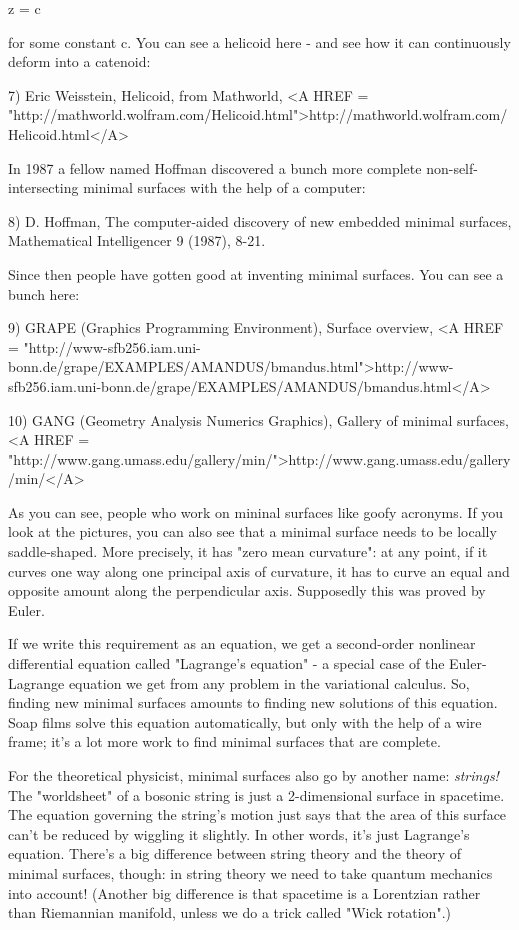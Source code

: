 z = c \theta 

for some constant c.   You can see a helicoid here - and see how it 
can continuously deform into a catenoid:

7) Eric Weisstein, Helicoid, from Mathworld,
<A HREF = "http://mathworld.wolfram.com/Helicoid.html">http://mathworld.wolfram.com/Helicoid.html</A>

In 1987 a fellow named Hoffman discovered a bunch more complete 
non-self-intersecting minimal surfaces with the help of a computer:

8) D. Hoffman, The computer-aided discovery of new embedded minimal 
surfaces, Mathematical Intelligencer 9 (1987), 8-21.

Since then people have gotten good at inventing minimal surfaces.  
You can see a bunch here:

9) GRAPE (Graphics Programming Environment), Surface overview,
<A HREF = "http://www-sfb256.iam.uni-bonn.de/grape/EXAMPLES/AMANDUS/bmandus.html">http://www-sfb256.iam.uni-bonn.de/grape/EXAMPLES/AMANDUS/bmandus.html</A>

10) GANG (Geometry Analysis Numerics Graphics), Gallery of minimal
surfaces, <A HREF = "http://www.gang.umass.edu/gallery/min/">http://www.gang.umass.edu/gallery/min/</A>
 
As you can see, people who work on mininal surfaces like goofy acronyms.
If you look at the pictures, you can also see that a minimal surface 
needs to be locally saddle-shaped.  More precisely, it has "zero mean 
curvature": at any point, if it curves one way along one principal
axis of curvature, it has to curve an equal and opposite amount along 
the perpendicular axis.  Supposedly this was proved by Euler.  

If we write this requirement as an equation, we get a second-order nonlinear
differential equation called "Lagrange's equation" - a special case 
of the Euler-Lagrange equation we get from any problem in the variational
calculus.  So, finding new minimal surfaces amounts to finding new 
solutions of this equation.  Soap films solve this equation automatically,
but only with the help of a wire frame; it's a lot more work to find
minimal surfaces that are complete.

For the theoretical physicist, minimal surfaces also go by another
name: \emph{strings!}  The "worldsheet" of
a bosonic string is just a 2-dimensional
surface in spacetime.  The equation governing the string's motion just
says that the area of this surface can't be reduced by wiggling it 
slightly.  In other words, it's just Lagrange's equation.
There's a big difference between string theory 
and the theory of minimal surfaces, though: in string theory we need 
to take quantum mechanics into account!  (Another big difference is
that spacetime is a Lorentzian rather than Riemannian manifold, unless
we do a trick called "Wick rotation".)

